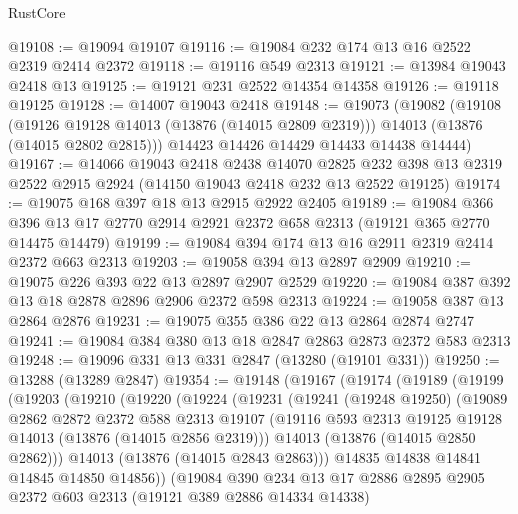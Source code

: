 \begin{lexlean}{RustCore}
\begin{coremodule}
@19108 := @19094 @19107
@19116 := @19084 @232 @174 @13 @16 @2522 @2319 @2414 @2372
@19118 := @19116 @549 @2313
@19121 := @13984 @19043 @2418 @13
@19125 := @19121 @231 @2522 @14354 @14358
@19126 := @19118 @19125
@19128 := @14007 @19043 @2418
@19148 := @19073
    (@19082
      (@19108
        (@19126 @19128 @14013 (@13876 (@14015 @2809 @2319)))
        @14013
        (@13876 (@14015 @2802 @2815)))
      @14423
      @14426
      @14429
      @14433
      @14438
      @14444)
@19167 := @14066
    @19043
    @2418
    @2438
    @14070
    @2825
    @232
    @398
    @13
    @2319
    @2522
    @2915
    @2924
    (@14150 @19043 @2418 @232 @13 @2522 @19125)
@19174 := @19075 @168 @397 @18 @13 @2915 @2922 @2405
@19189 := @19084
    @366
    @396
    @13
    @17
    @2770
    @2914
    @2921
    @2372
    @658
    @2313
    (@19121 @365 @2770 @14475 @14479)
@19199 := @19084 @394 @174 @13 @16 @2911 @2319 @2414 @2372 @663 @2313
@19203 := @19058 @394 @13 @2897 @2909
@19210 := @19075 @226 @393 @22 @13 @2897 @2907 @2529
@19220 := @19084 @387 @392 @13 @18 @2878 @2896 @2906 @2372 @598 @2313
@19224 := @19058 @387 @13 @2864 @2876
@19231 := @19075 @355 @386 @22 @13 @2864 @2874 @2747
@19241 := @19084 @384 @380 @13 @18 @2847 @2863 @2873 @2372 @583 @2313
@19248 := @19096 @331 @13 @331 @2847 (@13280 (@19101 @331))
@19250 := @13288 (@13289 @2847)
@19354 := @19148
    (@19167
      (@19174
        (@19189
          (@19199
            (@19203
              (@19210
                (@19220
                  (@19224
                    (@19231
                      (@19241
                        (@19248 @19250)
                        (@19089
                          @2862
                          @2872
                          @2372
                          @588
                          @2313
                          @19107
                          (@19116 @593 @2313 @19125 @19128 @14013 (@13876 (@14015 @2856 @2319)))
                          @14013
                          (@13876 (@14015 @2850 @2862)))
                        @14013
                        (@13876 (@14015 @2843 @2863)))
                      @14835
                      @14838
                      @14841
                      @14845
                      @14850
                      @14856))
                  (@19084
                    @390
                    @234
                    @13
                    @17
                    @2886
                    @2895
                    @2905
                    @2372
                    @603
                    @2313
                    (@19121 @389 @2886 @14334 @14338)

\end{coremodule}
\end{lexlean}

